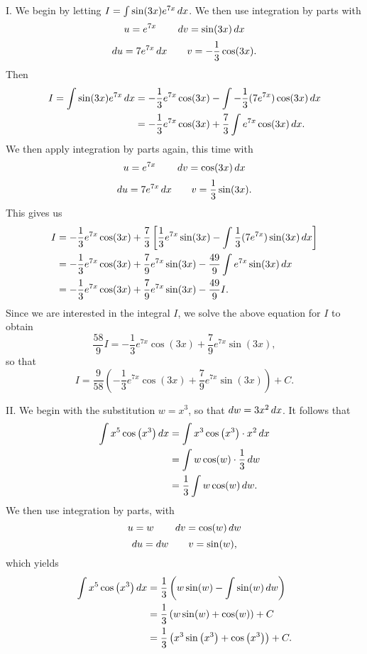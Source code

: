 \documentclass[]{ximera}
\begin{document}
\begin{freeResponse}
I. We begin by letting $I = \int \sin(3x) e^{7x} \mathop{}\!d x$.  
	We then use integration by parts with
		\[
		u = e^{7x} \qquad \mathop{}\!d v = \sin(3x) \mathop{}\!d x
		\]
		\[
		\mathop{}\!d u = 7e^{7x} \mathop{}\!d x \qquad v = -\frac{1}{3} \cos(3x).
		\]
	Then
		\begin{align*}
		I = \int \sin(3x) e^{7x} \mathop{}\!d x &= -\frac{1}{3} e^{7x} \cos(3x) - \int -\frac{1}{3} (7e^{7x}) \cos(3x) \mathop{}\!d x  \\
		 &= -\frac{1}{3} e^{7x} \cos(3x) + \frac{7}{3} \int e^{7x} \cos(3x) \mathop{}\!d x.
		\end{align*}
	We then apply integration by parts again, this time with
		\[
		u = e^{7x} 		\qquad	\mathop{}\!d v = \cos(3x) \mathop{}\!d x
		\]
		\[
		\mathop{}\!d u = 7e^{7x} \mathop{}\!d x 	\qquad	v = \frac{1}{3} \sin(3x).
		\]
	This gives us
		\begin{align*}
		I &= -\frac{1}{3} e^{7x} \cos(3x) + \frac{7}{3} \left[ \frac{1}{3} e^{7x} \sin(3x) - \int \frac{1}{3} (7e^{7x}) \sin(3x) \mathop{}\!d x \right]  \\
				&= -\frac{1}{3} e^{7x} \cos(3x) + \frac{7}{9} e^{7x} \sin(3x) - \frac{49}{9} \int e^{7x} \sin(3x) \mathop{}\!d x  \\
		&= -\frac{1}{3} e^{7x} \cos(3x) + \frac{7}{9} e^{7x} \sin(3x) - \frac{49}{9} I.
		\end{align*}
		Since we are interested in the integral $I$, we solve the above equation for $I$ to obtain
		$$
		\frac{58}{9} I = -\frac{1}{3} e^{7x} \cos(3x) + \frac{7}{9} e^{7x} \sin(3x),
		$$
		so that 
		$$
		I = \frac{9}{58} \left( -\frac{1}{3} e^{7x} \cos(3x) + \frac{7}{9} e^{7x} \sin(3x) \right) + C.
		$$
		
		II. We begin with the substitution $w = x^3$, so that $\mathop{}\!d w = 3x^2 \mathop{}\!d x$. It follows that 
		\begin{align*}
		\int x^5 \cos \left( x^3 \right) \mathop{}\!d x 
		&= \int x^3 \cos \left( x^3 \right) \cdot x^2 \mathop{}\!d x  \\
		&= \int w \cos(w) \cdot \frac{1}{3} \mathop{}\!d w  \\
		&= \frac{1}{3} \int w \cos(w) \mathop{}\!d w.
		\end{align*}
	We then use integration by parts, with
		\[
		u = w 		\qquad	\mathop{}\!d v = \cos(w) \mathop{}\!d w
		\]
		\[
		\mathop{}\!d u = \mathop{}\!d w 	\qquad	v = \sin(w),
		\]
	which yields
		\begin{align*}
		\int x^5 \cos \left( x^3 \right) \mathop{}\!d x 
		&= \frac{1}{3} \left( w \sin(w) - \int \sin(w) \mathop{}\!d w \right)  \\
		&= \frac{1}{3} \left( w \sin(w) + \cos(w) \right) + C  \\
		&= \frac{1}{3} \left( x^3 \sin \left( x^3 \right) + \cos \left( x^3 \right) \right) + C.  
		\end{align*}
\end{freeResponse}
\end{document}
